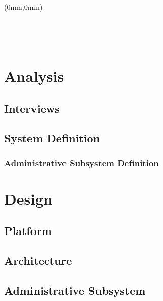 


	\begin{titlepage}
	\begin{textblock*}{297mm}(0mm,0mm)
		 \hspace{-6.5mm}

		

	\end{textblock*}
	\thispagestyle{empty}

\ \pagebreak{} 
	\end{titlepage}
\ \thispagestyle{empty} \ \pagebreak{}



\tableofcontents
\cleardoublepage
	
\newpage
\thispagestyle{empty}
\begin{titlepage}
\end{titlepage}
	
	
	\chapter{Analysis}
		\section{Interviews}
		\section{System Definition}
			\subsection{Administrative Subsystem Definition}

	\chapter{Design}
		\section{Platform}
		\section{Architecture}
		\section{Administrative Subsystem}

